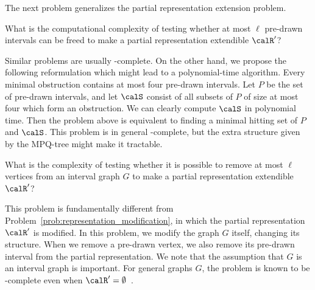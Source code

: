 The next problem generalizes the partial representation extension problem.

\begin{problem} \label{prob:representation_modification}
What is the computational complexity of testing whether at most $\ell$ pre-drawn intervals can be
freed to make a partial representation extendible $\calR'$?
\end{problem}

Similar problems are usually \cNP-complete. On the other hand, we propose the following reformulation
which might lead to a polynomial-time algorithm. Every minimal obstruction contains at most four
pre-drawn intervals. Let $P$ be the set of pre-drawn intervals, and let $\calS$ consist of all
subsets of $P$ of size at most four which form an obstruction.  We can clearly compute $\calS$ in
polynomial time. Then the problem above is equivalent to finding a minimal hitting set of $P$ and
$\calS$. This problem is in general \cNP-complete, but the extra structure given by the MPQ-tree
might make it tractable.

\begin{problem} \label{prob:graph_modification}
What is the complexity of testing whether it is possible to remove at most $\ell$ vertices from an
interval graph $G$ to make a partial representation extendible $\calR'$?
\end{problem}

This problem is fundamentally different from Problem~\ref{prob:representation_modification}, in
which the partial representation $\calR'$ is modified. In this problem, we modify the graph $G$
itself, changing its structure. When we remove a pre-drawn vertex, we also remove its pre-drawn
interval from the partial representation. We note that the assumption that $G$ is an interval graph
is important. For general graphs $G$, the problem is known to be \cNP-complete even when $\calR' =
\emptyset$~\cite{node_deletion_hereditary}.
